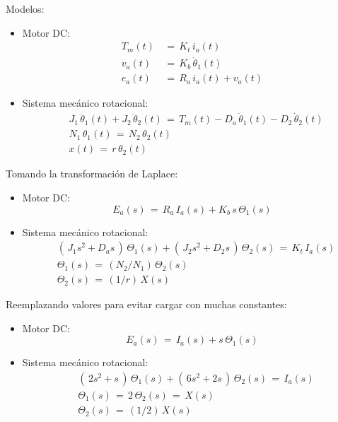 \documentclass[ 10pt, xcolor = dvipsnames]{beamer}
\begin{document}
\begin{frame}[allowframebreaks]
\frametitle{\insertsection}

Modelos: 
\begin{itemize}
\item Motor DC: 
\begin{align*}
T_m(t) \, & = \, K_t \, i_a(t) \\[1ex]
v_a(t) \, & = \, K_b \, \dot{\theta}_1(t) \\[1ex]
e_a(t) \, & = \, R_a \, i_a(t) + v_a(t)
\end{align*}
\item Sistema mec\'anico rotacional: 
\begin{align*}
& J_1 \, \ddot{\theta}_1(t) + J_2 \, \ddot{\theta}_2(t) 
\, = \, T_m(t) - D_a \, \dot{\theta}_1(t) - D_2 \, \dot{\theta}_2(t) \\[1ex]
& N_1 \, \theta_1(t) \, = \, N_2 \, \theta_2(t) \\[1ex]
& x(t) \, = \, r \, \theta_2(t)
\end{align*}
\end{itemize}
\framebreak

Tomando la transformaci\'on de Laplace: 
\begin{itemize}
\item Motor DC: 
\[
E_a(s) \, = \, R_a \, I_a(s) + K_b \, s \, \Theta_1(s)
\]
\item Sistema mec\'anico rotacional: 
\begin{align*}
& ( \, J_1 s^2 + D_a s \, ) \, \Theta_1(s) + 
( \, J_2 s^2 + D_2 s \, ) \, \Theta_2(s) 
\, = \, K_t \, I_a(s) \\[1ex]
& \Theta_1(s) \, = \, ( N_2/N_1 ) \, \Theta_2(s) \\[1ex]
& \Theta_2(s) \, = \, (1/r) \, X(s)
\end{align*}
\end{itemize}
\framebreak

Reemplazando valores para evitar cargar con muchas constantes: 
\begin{itemize}
\item Motor DC: 
\[
E_a(s) \, = \, I_a(s) + s \, \Theta_1(s)
\]
\item Sistema mec\'anico rotacional: 
\begin{align*}
& ( \, 2 s^2 + s \, ) \, \Theta_1(s) + 
( \, 6 s^2 + 2 s \, ) \, \Theta_2(s) 
\, = \, I_a(s) \\[1ex]
& \Theta_1(s) \, = \, 2 \, \Theta_2(s) \, = \, X(s) \\[1ex]
& \Theta_2(s) \, = \, (1/2) \, X(s)
\end{align*}
\end{itemize}
\framebreak


\end{frame}
\end{document}
